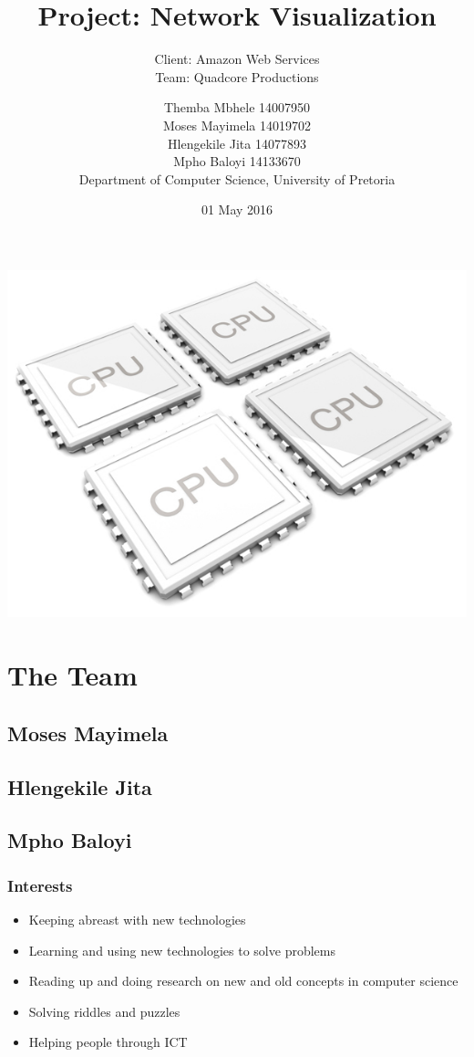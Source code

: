 \documentclass{scrartcl}
\title{Project: Network Visualization}
\subtitle{Client: Amazon Web Services \\ Team: Quadcore Productions\\}
\author{Themba Mbhele 14007950\\ Moses Mayimela 14019702 \\ Hlengekile Jita 14077893 \\ Mpho Baloyi 14133670 \\Department of Computer Science, University of Pretoria}
\date{01 May 2016}
\begin{document}
\maketitle
\includegraphics[width=\textwidth]{2012-quad-core-phones}
\newpage
\tableofcontents
\section{The Team}
\subsection{Moses Mayimela}
\subsection{Hlengekile Jita}
\subsection{Mpho Baloyi}
\subsubsection{Interests}
\begin{itemize}
\item Keeping abreast with new technologies
\item Learning and using new technologies to solve problems
\item Reading up and doing research on new and old concepts in computer science
\item Solving riddles and puzzles
\item Helping people through ICT
\end{itemize}
\end{document}
